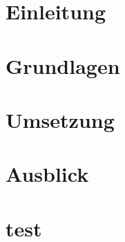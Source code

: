 \documentclass[
ngerman          			%
,a4paper          			%
, 12pt
,pdftex
]{article}
\begin{document}
	\begin{abstract}
		
		\thispagestyle{empty}
	\end{abstract}
	\clearpage
%		
	
	
	\setcounter{page}{1}
	
	\pagestyle{fancy}
	\fancyhf{}
	\setlength{\headheight}{35pt}
	
	\cfoot{\thepage}
	
	
	\clearpage
	\section{Einleitung}
	\label{sec:Einleitung}
	
	
	\clearpage
	\section{Grundlagen}
	\label{sec:Grundlagen}
	
	\clearpage
	\section{Umsetzung}
	\label{sec:Umsetzung}
	
	\clearpage
	\section{Ausblick}
	\label{sec:Ausblick}
	
	
	\clearpage
	\setcounter{page}{8}	%
	
	\appendix
	\section{test}
	
	\clearpage
	
	\def\refname{Literaturverzeichnis}
	\printbibliography
\end{document}
